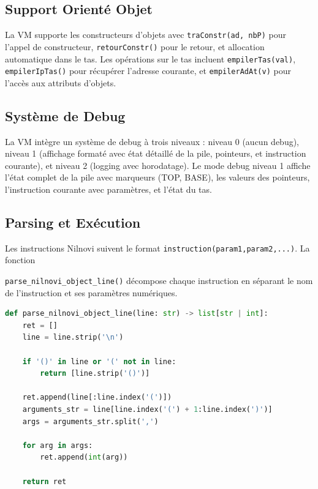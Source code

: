 \documentclass[a4paper, 12pt]{article}
\begin{document}
    \subsection{Support Orienté Objet}

    La VM supporte les constructeurs d'objets avec \texttt{traConstr(ad, nbP)} pour l'appel de constructeur, \texttt{retourConstr()} pour le retour, et allocation automatique dans le tas. Les opérations sur le tas incluent \texttt{empilerTas(val)}, \texttt{empilerIpTas()} pour récupérer l'adresse courante, et \texttt{empilerAdAt(v)} pour l'accès aux attributs d'objets.

    \subsection{Système de Debug}

    La VM intègre un système de debug à trois niveaux : niveau 0 (aucun debug), niveau 1 (affichage formaté avec état détaillé de la pile, pointeurs, et instruction courante), et niveau 2 (logging avec horodatage). Le mode debug niveau 1 affiche l'état complet de la pile avec marqueurs (TOP, BASE), les valeurs des pointeurs, l'instruction courante avec paramètres, et l'état du tas.

    \subsection{Parsing et Exécution}

    Les instructions Nilnovi suivent le format \texttt{instruction(param1,param2,...)}. La fonction 

    \texttt{parse\_nilnovi\_object\_line()} décompose chaque instruction en séparant le nom de l'instruction et ses paramètres numériques. 

    \begin{lstlisting}[caption=Parsing d'instruction,language=python, xleftmargin=20pt]
def parse_nilnovi_object_line(line: str) -> list[str | int]:
    ret = []
    line = line.strip('\n')
    
    if '()' in line or '(' not in line:
        return [line.strip('()')]
    
    ret.append(line[:line.index('(')])
    arguments_str = line[line.index('(') + 1:line.index(')')]
    args = arguments_str.split(',')
    
    for arg in args: 
        ret.append(int(arg))
    
    return ret \end{lstlisting}
\end{document}
